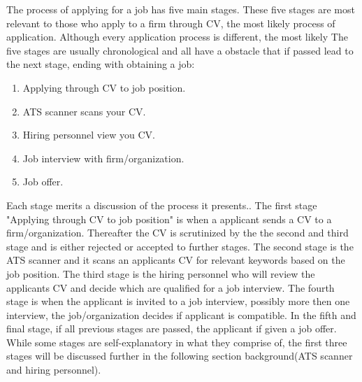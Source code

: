 The process of applying for a job has five main stages.
These five stages are most relevant to those who apply to a firm through CV, the most likely process of application.
Although every application process is different, the most likely 
The five stages are usually chronological and all have a obstacle that if passed lead to the next stage, ending with obtaining a job:
\begin{enumerate}
   \item Applying through CV to job position.
   \item ATS scanner scans your CV.
   \item Hiring personnel view you CV.
   \item Job interview with firm/organization.
   \item Job offer.\cite{Process_steps_unemployment} \\
\end{enumerate}
Each stage merits a discussion of the process it presents..
The first stage "Applying through CV to job position" is when a applicant sends a CV to a firm/organization.
Thereafter the CV is scrutinized by the the second and third stage and is either rejected or accepted to further stages.
The second stage is the ATS scanner and it scans an applicants CV for relevant keywords based on the job position.
The third stage is the hiring personnel who will review the applicants CV and decide which are qualified for a job interview.
The fourth stage is when the applicant is invited to a job interview, possibly more then one interview, the job/organization decides if applicant is compatible.
In the fifth and final stage, if all previous stages are passed, the applicant if given a job offer.
While some stages are self-explanatory in what they comprise of, the first three stages will be discussed further in the following section background(ATS scanner and hiring personnel). \\

